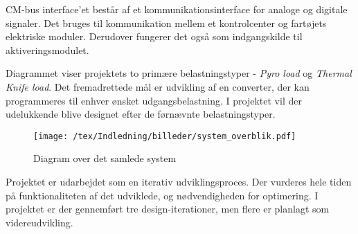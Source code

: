 CM-bus interface'et består af et kommunikationsinterface for analoge og digitale signaler. Det bruges til kommunikation mellem et kontrolcenter og fartøjets elektriske moduler. Derudover fungerer det også som indgangskilde til aktiveringsmodulet. 

Diagrammet viser projektets to primære belastningstyper - \textit{Pyro load} og \textit{Thermal Knife load}. Det fremadrettede mål er udvikling af en converter, der kan programmeres til enhver ønsket udgangsbelastning. I projektet vil der udelukkende blive designet efter de førnævnte belastningstyper.

\begin{figure}[H]
	\center
	\texttt{[image: /tex/Indledning/billeder/system\_overblik.pdf]}
	\caption{Diagram over det samlede system}
	\label{fig:system_overblik}
\end{figure}

\noindent Projektet er udarbejdet som en iterativ udviklingsproces. Der vurderes hele tiden på funktionaliteten af det udviklede, og nødvendigheden for optimering. I projektet er der gennemført tre design-iterationer, men flere er planlagt som videreudvikling. 




\clearpage

